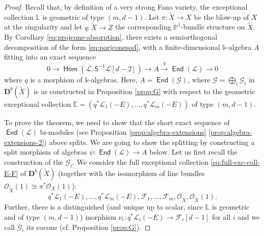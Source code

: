 \documentclass[a4paper,11pt, reqno]{amsart}
\def\E{\mathbb E}
\def\L{\mathbb L}
\def\P{\mathbb P}
\def\DD{\mathbf D}
\def\OO{\mathcal O}
\def\sF{\mathscr{F}}
\def\sG{\mathscr{G}}
\def\sL{\mathscr{L}}
\newcommand{\opname}[1]{\operatorname{\mathsf{#1}}}
\newcommand{\Hom}{\opname{Hom}}
\newcommand{\End}{\opname{End}}
\def\Db{\DD^b}
\newcommand{\bS}{\mathsf{S}}
\theoremstyle{plain}
\theoremstyle{definition}
\numberwithin{equation}{section}
\newlength{\arrow}
\begin{document}
\begin{proof}
Recall that, by definition of a very strong Fano variety, the exceptional collection $\L$ is geometric of type $(m, d-1)$.
 Let $\pi \colon \tilde{X}\to X$ be the blow-up of $X$ at the singularity and let $q\colon \tilde{X} \to Z$ the corresponding $\P^1$-bundle structure on $\tilde{X}$.
By Corollary \ref{eq:projcone-absorption}, there exists a semiorthogonal decomposition of the form \eqref{eq:porjconesod}, with a finite-dimensional $\mathbb{k}$-algebra $A$ fitting into an exact sequence
\[
0\to \Hom ( \sL , \bS^{-1} \sL [d-2] ) \to A \xrightarrow{q} \End ( \sL  ) \to 0 
    \]
 where $q$ is a morphism of $\mathbb{k}$-algebras.
 Here, $A=\End (\sG )$, where $\sG = \bigoplus_i \sG_i$ in $\Db( \tilde{X})$ is as constructed in Proposition \ref{prop:G} with respect to the geometric exceptional collection $\E = ( q^\ast \sL_1 (-E) , \ldots , q^\ast \sL_m (-E) )$ of type $(m, d-1 )$. 

To prove the theorem, we need to show that the short exact sequence of $\End ( \sL )$ bi-modules (see Proposition \ref{prop:algebra-extensions} \eqref{prop:algebra-extensions-2}) above splits.
We are going to show the splitting by constructing a split morphism of algebras $\psi \colon \End ( \sL ) \to A$ below.
    Let us first recall the construction of the $\sG_i$.
    We consider the full exceptional collection \eqref{eq:full-exc-coll-E-F} of $\Db( \tilde{X} )$ (together with the isomorphism of line bundles $\OO_{\tilde{X}} (1 ) \cong \pi^\ast \OO_X(1)$):
    \[
    q^\ast \sL_1 (-E) , \ldots , q^\ast \sL_m (-E) , \sF_1 , \ldots, \sF_{m} , \OO_{\tilde{X}} , \OO_{\tilde{X}}(1) .
    \]
     Further, 
     there is a distinguished (and unique up to scalar, since $\L$ is geometric and of type $(m, d-1 )$) morphism $\nu_i \colon q^\ast \sL_i (-E) \to \sF_i [d-1]$ for all $i$ and we call $\sG_i$ its cocone (cf. Proposition \ref{prop:G}).


\end{proof}
\end{document}
